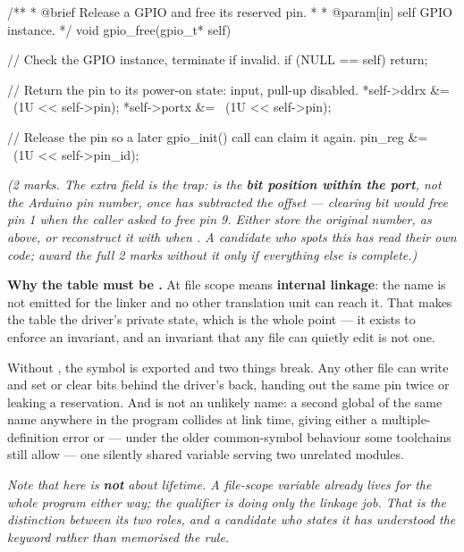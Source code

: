 \begin{ccode}
/**
 * @brief Release a GPIO and free its reserved pin.
 *
 * @param[in] self GPIO instance.
 */
void gpio_free(gpio_t* self)
{
    // Check the GPIO instance, terminate if invalid.
    if (NULL == self) { return; }

    // Return the pin to its power-on state: input, pull-up disabled.
    *self->ddrx &= ~(1U << self->pin);
    *self->portx &= ~(1U << self->pin);

    // Release the pin so a later gpio_init() call can claim it again.
    pin_reg &= ~(1U << self->pin_id);
}
\end{ccode}

{\itshape (2 marks. The extra field is the trap:  is the \textbf{bit position within
the port}, not the Arduino pin number, once  has subtracted the offset ---
clearing  bit  would free pin 1 when the caller asked to free pin 9.
Either store the original number, as above, or reconstruct it with 
when . A candidate who spots this has read their own code; award the
full 2 marks without it only if everything else is complete.)\par}

\medskip \textbf{Why the table must be .} At file scope  means
\textbf{internal linkage}: the name is not emitted for the linker and no other translation unit can
reach it. That makes the table the driver's private state, which is the whole point --- it exists to
enforce an invariant, and an invariant that any file can quietly edit is not one.

Without , the symbol is exported and two things break. Any other file can write
 and set or clear bits behind the driver's back, handing out the same
pin twice or leaking a reservation. And  is not an unlikely name: a second global of
the same name anywhere in the program collides at link time, giving either a multiple-definition
error or --- under the older common-symbol behaviour some toolchains still allow --- one silently
shared variable serving two unrelated modules. 

{\itshape Note that  here is \textbf{not} about lifetime. A file-scope variable already
lives for the whole program either way; the qualifier is doing only the linkage job. That is the
distinction between its two roles, and a candidate who states it has understood the keyword rather
than memorised the rule.\par}

